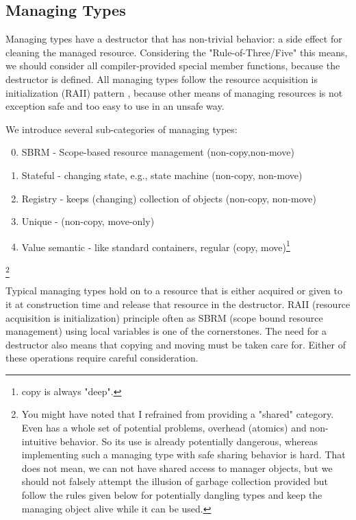 \documentclass[ebook,11pt,article]{memoir}
\begin{document}
\subsection{Managing Types}
Managing types have a destructor that has non-trivial behavior: a side effect for cleaning the managed resource. Considering the "Rule-of-Three/Five" this means, we should consider all compiler-provided special member functions, because the destructor is defined. All managing types follow the resource acquisition is initialization (RAII) pattern \cite{Stroustrup2000}, because other means of managing resources is not exception safe and too easy to use in an unsafe way.
 
We introduce several sub-categories of managing types:

\begin{enumerate}
\setcounter{enumi}{-1}
\item SBRM - Scope-based resource management (non-copy,non-move)
\item Stateful - changing state, e.g., state machine (non-copy, non-move)
\item Registry - keeps (changing) collection of objects (non-copy, non-move)
\item Unique -  (non-copy, move-only)
\item Value semantic - like standard containers, regular (copy, move)\footnote{copy is always "deep".}
\end{enumerate}

\footnote{You might have noted that I refrained from providing a "shared" category. Even  has a whole set of potential problems, overhead (atomics) and non-intuitive behavior. So its use is already potentially dangerous, whereas implementing such a managing type with safe sharing behavior is hard. That does not mean, we can not have shared access to manager objects, but we should not falsely attempt the illusion of garbage collection provided but follow the rules given below for potentially dangling types and keep the managing object alive while it can be used.}

Typical managing types hold on to a resource that is either acquired or given to it at construction time and release that resource in the destructor. \Cpp{} RAII (resource acquisition is initialization) principle often as SBRM (scope bound resource management) using local variables is one of the cornerstones.
The need for a destructor also means that copying and moving must be taken care for. Either of these operations require careful consideration.
\end{document}
